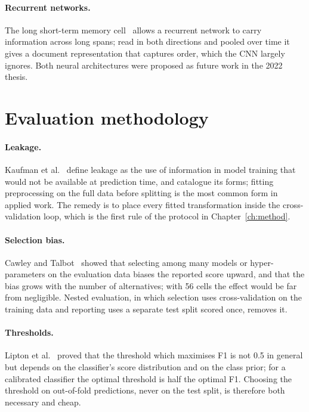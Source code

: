 \paragraph{Recurrent networks.} The long short-term memory cell~\cite{hochreiter1997} allows a recurrent network to carry information across long spans; read in both directions and pooled over time it gives a document representation that captures order, which the CNN largely ignores. Both neural architectures were proposed as future work in the 2022 thesis.

\section{Evaluation methodology}
\label{sec:bgmethod}
\paragraph{Leakage.} Kaufman et al.~\cite{kaufman2012} define leakage as the use of information in model training that would not be available at prediction time, and catalogue its forms; fitting preprocessing on the full data before splitting is the most common form in applied work. The remedy is to place every fitted transformation inside the cross-validation loop, which is the first rule of the protocol in Chapter~\ref{ch:method}.

\paragraph{Selection bias.} Cawley and Talbot~\cite{cawley2010} showed that selecting among many models or hyper-parameters on the evaluation data biases the reported score upward, and that the bias grows with the number of alternatives; with 56 cells the effect would be far from negligible. Nested evaluation, in which selection uses cross-validation on the training data and reporting uses a separate test split scored once, removes it.

\paragraph{Thresholds.} Lipton et al.~\cite{lipton2014} proved that the threshold which maximises F1 is not 0.5 in general but depends on the classifier's score distribution and on the class prior; for a calibrated classifier the optimal threshold is half the optimal F1. Choosing the threshold on out-of-fold predictions, never on the test split, is therefore both necessary and cheap.

